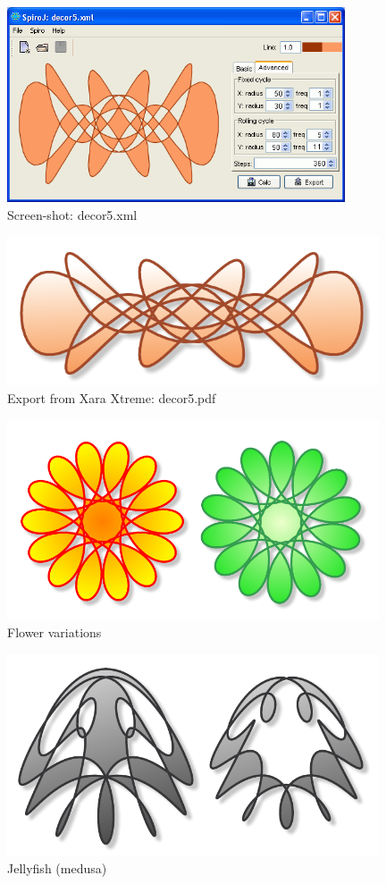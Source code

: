 \documentclass[12pt, a4paper]{article}
\begin{document}
\begin{figure}[ht]\centering
  \includegraphics[width=10cm]{decor5_screen}
  \caption{Screen-shot: decor5.xml}
  \label{decor5sc}
\end{figure}

\begin{figure}[ht]\centering
  \includegraphics[width=11cm]{decor5}
  \caption{Export from Xara Xtreme: decor5.pdf}
  \label{decor5}
\end{figure}

\begin{figure}[ht]\centering
  \includegraphics[width=11cm]{kvetina}
  \caption{Flower variations}
  \label{kvetina}
\end{figure}

\begin{figure}[ht]\centering
  \includegraphics[width=11cm]{meduza}
  \caption{Jellyfish (medusa)}
  \label{meduza}
\end{figure}
\end{document}
